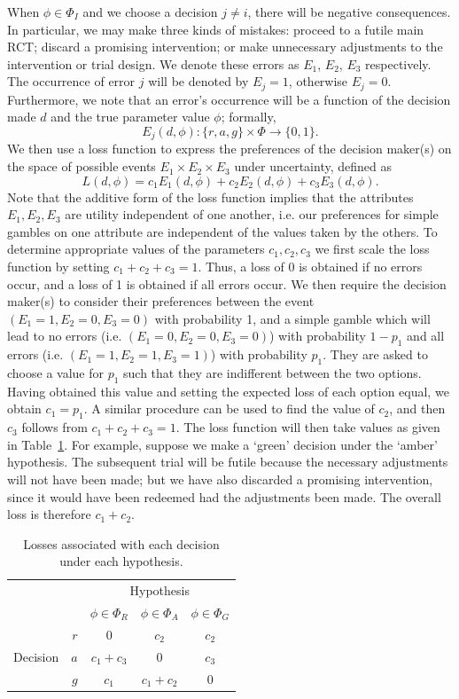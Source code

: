 \documentclass[AMA,STIX1COL]{WileyNJD-v2}
\begin{document}
When $\phi \in \Phi_{I}$ and we choose a decision $j \neq i$, there will be negative consequences. In particular, we may make three kinds of mistakes: proceed to a futile main RCT; discard a promising intervention; or make unnecessary adjustments to the intervention or trial design. We denote these errors as $E_1$, $E_2$, $E_3$ respectively. The occurrence of error $j$ will be denoted by $E_j = 1$, otherwise $E_j = 0$. Furthermore, we note that an error's occurrence will be a function of the decision made $d$ and the true parameter value $\phi$; formally,
$$
E_j(d, \phi): \{r, a, g\} \times \Phi \rightarrow \{0,1\}.
$$
We then use a loss function to express the preferences of the decision maker(s) on the space of possible events $E_1 \times E_2 \times E_3$ under uncertainty, defined as
$$
L(d, \phi) = c_1 E_1(d, \phi) + c_2 E_2(d, \phi) + c_3 E_3(d, \phi).
$$
Note that the additive form of the loss function implies that the attributes $E_1, E_2, E_3$ are utility independent of one another, i.e. our preferences for simple gambles on one attribute are independent of the values taken by the others. To determine appropriate values of the parameters $c_1, c_2, c_3$ we first scale the loss function by setting $c_1 + c_2 + c_3 = 1$. Thus, a loss of 0 is obtained if no errors occur, and a loss of 1 is obtained if all errors occur. We then require the decision maker(s) to consider their preferences between the event $(E_1 = 1, E_2 = 0, E_3 = 0)$ with probability 1, and a simple gamble which will lead to no errors (i.e. $(E_1 = 0, E_2 = 0, E_3 = 0)$) with probability $1 - p_1$ and all errors (i.e. $(E_1 = 1, E_2 = 1, E_3 = 1)$) with probability $p_1$. They are asked to choose a value for $p_1$ such that they are indifferent between the two options. Having obtained this value and setting the expected loss of each option equal, we obtain $c_1 = p_1$. A similar procedure can be used to find the value of $c_2$, and then $c_3$ follows from $c_1 + c_2 + c_3 = 1$. The loss function will then take values as given in Table~\ref{tab:loss}. For example, suppose we make a `green' decision under the `amber' hypothesis. The subsequent trial will be futile because the necessary adjustments will not have been made; but we have also discarded a promising intervention, since it would have been redeemed had the adjustments been made. The overall loss is therefore $c_{1} + c_{2}$.

\begin{table}
\caption{Losses associated with each decision under each hypothesis.}
\centering
\begin{tabular}{r r c c c}
\toprule
& & \multicolumn{3}{c}{Hypothesis} \\
& & $\phi \in \Phi_{R}$ & $\phi \in \Phi_{A}$ & $\phi \in \Phi_{G}$ \\
\midrule
\multirow{3}{*}{Decision} & $r$ & 0 & $c_{2}$ & $c_{2}$ \\
 & $a$ & $c_{1} + c_{3}$ & 0 & $c_{3}$ \\
 & $g$ & $c_{1}$ & $c_{1} + c_{2}$ & 0  \\
\bottomrule
\end{tabular}
\label{tab:loss}
\end{table}
\end{document}
